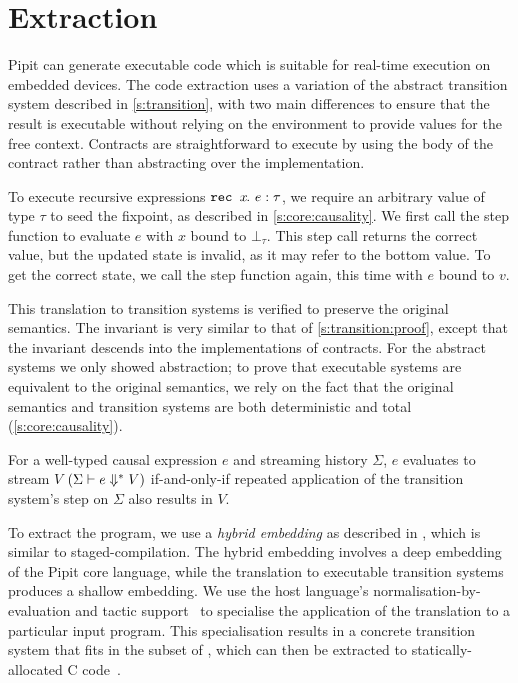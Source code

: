 

\section{Extraction}
\label{s:extraction}

Pipit can generate executable code which is suitable for real-time execution on embedded devices.
The code extraction uses a variation of the abstract transition system described in \autoref{s:transition}, with two main differences to ensure that the result is executable without relying on the environment to provide values for the free context.
Contracts are straightforward to execute by using the body of the contract rather than abstracting over the implementation.

To execute recursive expressions $\texttt{rec~} x\hspace{-0.1em}.~e : \tau$, we require an arbitrary value of type $\tau$ to seed the fixpoint, as described in \autoref{s:core:causality}.
We first call the step function to evaluate $e$ with $x$ bound to $\bot_\tau$.
This step call returns the correct value, but the updated state is invalid, as it may refer to the bottom value.
To get the correct state, we call the step function again, this time with $e$ bound to $v$.


This translation to transition systems is verified to preserve the original semantics.
The invariant is very similar to that of \autoref{s:transition:proof}, except that the invariant descends into the implementations of contracts.
For the abstract systems we only showed abstraction; to prove that executable systems are equivalent to the original semantics, we rely on the fact that the original semantics and transition systems are both deterministic and total (\autoref{s:core:causality}).

\begin{theorem}
  For a well-typed causal expression $e$ and streaming history $\Sigma$, $e$ evaluates to stream $V$ $(\Sigma \vdash e \Downarrow^{*} V)$ if-and-only-if repeated application of the transition system's step on $\Sigma$ also results in $V$.
\end{theorem}

To extract the program, we use a \emph{hybrid embedding} as described in \cite{ho2022noise}, which is similar to staged-compilation.
The hybrid embedding involves a deep embedding of the Pipit core language, while the translation to executable transition systems produces a shallow embedding.
We use the \fstar{} host language's normalisation-by-evaluation and tactic support~\cite{martinez2019meta} to specialise the application of the translation to a particular input program.
This specialisation results in a concrete transition system that fits in the \lowstar{} subset of \fstar{}, which can then be extracted to statically-allocated C code~\cite{protzenko2017verified}.

